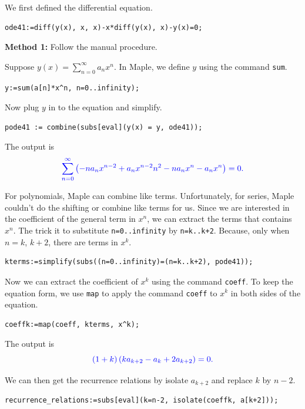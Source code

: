 \documentclass[
  12pt]{elegantbook}
\begin{document}
\begin{solution}
We first defined the differential equation.

\begin{verbatim}
ode41:=diff(y(x), x, x)-x*diff(y(x), x)-y(x)=0;
\end{verbatim}

\textbf{Method 1:} Follow the manual procedure.

Suppose \(y(x)=\sum\limits_{n=0}^\infty a_nx^n\). In Maple, we define \(y\) using the command \texttt{sum}.

\begin{verbatim}
y:=sum(a[n]*x^n, n=0..infinity);
\end{verbatim}

Now plug \(y\) in to the equation and simplify.

\begin{verbatim}
pode41 := combine(subs[eval](y(x) = y, ode41));
\end{verbatim}

The output is
\[\color{blue}{\sum\limits_{n=0}^\infty\left(-n a_{n} x^{n -2}+a_{n} x^{n -2} n^{2}-n a_{n} x^{n}-a_{n} x^{n}\right) = 0}.\]

For polynomials, Maple can combine like terms. Unfortunately, for series, Maple couldn't do the shifting or combine like terms for us. Since we are interested in the coefficient of the general term in \(x^n\), we can extract the terms that contains \(x^n\). The trick it to substitute \texttt{n=0..infinity} by \texttt{n=k..k+2}. Because, only when \(n=k\), \(k+2\), there are terms in \(x^k\).

\begin{verbatim}
kterms:=simplify(subs((n=0..infinity)=(n=k..k+2), pode41));
\end{verbatim}

Now we can extract the coefficient of \(x^k\) using the command \texttt{coeff}. To keep the equation form, we use \texttt{map} to apply the command \texttt{coeff} to \(x^k\) in both sides of the equation.

\begin{verbatim}
coeffk:=map(coeff, kterms, x^k);
\end{verbatim}

The output is
\[\color{blue}{\left(1+k \right) \left(k a_{k +2}-a_{k}+2 a_{k +2}\right) = 0}.\]

We can then get the recurrence relations by isolate \(a_{k+2}\) and replace \(k\) by \(n-2\).

\begin{verbatim}
recurrence_relations:=subs[eval](k=n-2, isolate(coeffk, a[k+2]));
\end{verbatim}


\end{solution}
\end{document}

